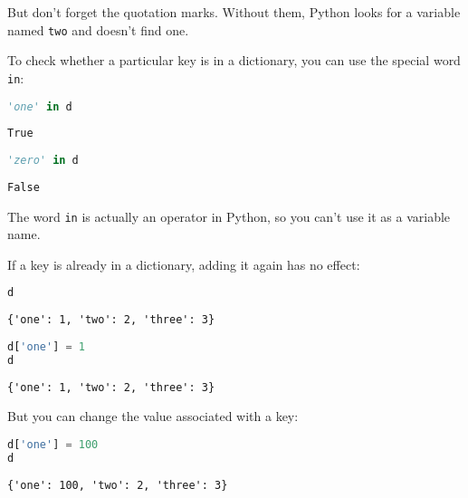 But don't forget the quotation marks. Without them, Python looks for a
variable named \passthrough{\lstinline!two!} and doesn't find one.

To check whether a particular key is in a dictionary, you can use the
special word \passthrough{\lstinline!in!}:

\begin{lstlisting}[language=Python,style=source]
'one' in d
\end{lstlisting}

\begin{lstlisting}[style=output]
True
\end{lstlisting}

\begin{lstlisting}[language=Python,style=source]
'zero' in d
\end{lstlisting}

\begin{lstlisting}[style=output]
False
\end{lstlisting}

The word \passthrough{\lstinline!in!} is actually an operator in Python,
so you can't use it as a variable name.

If a key is already in a dictionary, adding it again has no effect:

\begin{lstlisting}[language=Python,style=source]
d
\end{lstlisting}

\begin{lstlisting}[style=output]
{'one': 1, 'two': 2, 'three': 3}
\end{lstlisting}

\begin{lstlisting}[language=Python,style=source]
d['one'] = 1
d
\end{lstlisting}

\begin{lstlisting}[style=output]
{'one': 1, 'two': 2, 'three': 3}
\end{lstlisting}

But you can change the value associated with a key:

\begin{lstlisting}[language=Python,style=source]
d['one'] = 100
d
\end{lstlisting}

\begin{lstlisting}[style=output]
{'one': 100, 'two': 2, 'three': 3}
\end{lstlisting}

